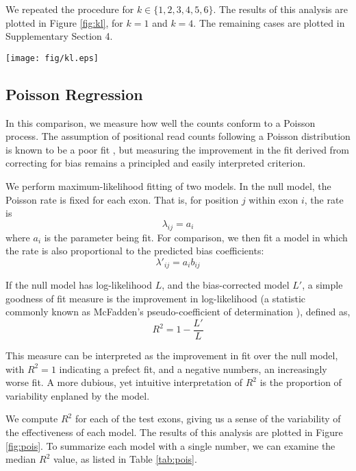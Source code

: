 \documentclass{bioinfo}
\begin{document}
We repeated the procedure for $k \in \{1, 2, 3, 4, 5, 6\}$. The results of this
analysis are plotted in Figure \ref{fig:kl}, for $k = 1$ and $k = 4$. The
remaining cases are plotted in Supplementary Section 4.

\begin{figure*}
\centerline{\texttt{[image: fig/kl.eps]}}
\caption{The Kullback-Leibler divergence compares the frequency of $k$-mers
(here, for $k = 1$ and $k = 4$) surrounding the starts of aligned reads to the
frequencies expected under the assumption of uniform sampling from within exons.
A large divergence indicates significant bias. Plotted here is the divergence
from unadjusted reads counts as well as after adjusting reads counts using each
method.}
\label{fig:kl}
\end{figure*}


\subsection{Poisson Regression}

In this comparison, we measure how well the counts conform to a Poisson process.
The assumption of positional read counts following a Poisson distribution is
known to be a poor fit \citep{Srivastava2010}, but measuring the improvement in
the fit derived from correcting for bias remains a principled and easily
interpreted criterion.

We perform maximum-likelihood fitting of two models. In the null model, the
Poisson rate is fixed for each exon. That is, for position $j$ within
exon $i$, the rate is
$$ \lambda_{ij} = a_i $$
where $a_i$ is the parameter being fit. For comparison, we then fit a model in
which the rate is also proportional to the predicted bias coefficients:
$$ \lambda'_{ij} = a_i b_{ij} $$

If the null model has log-likelihood $L$, and the bias-corrected model $L'$, a
simple goodness of fit measure is the improvement in log-likelihood (a statistic
commonly known as McFadden's pseudo-coefficient of determination
\citep{McFadden1974}), defined as,
$$R^2 = 1 - \frac{L'}{L}$$

This measure can be interpreted as the improvement in fit over the null model,
with $R^2 = 1$ indicating a prefect fit, and a negative numbers, an increasingly
worse fit. A more dubious, yet intuitive interpretation of $R^2$ is the
proportion of variability enplaned by the model.

We compute $R^2$ for each of the test exons, giving us a sense of the variability
of the effectiveness of each model. The results of this analysis are plotted in
Figure \ref{fig:pois}.  To summarize each model with a single number, we can
examine the median $R^2$ value, as listed in Table \ref{tab:pois}.
\end{document}
